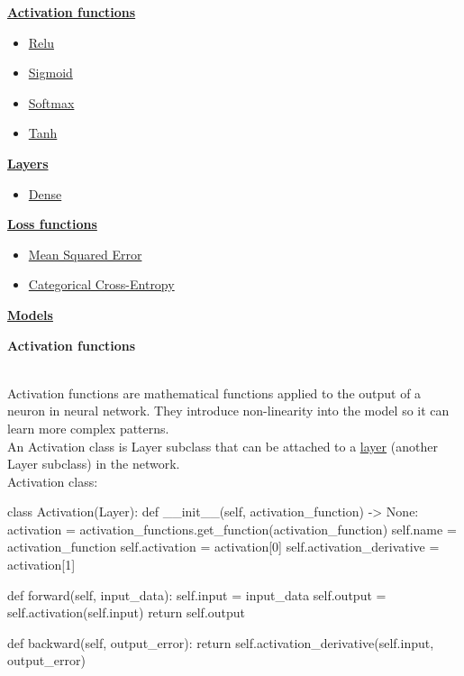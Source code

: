 \documentclass{article}
\begin{document}
    \hyperlink{activation_functions}{\textbf{Activation functions}}
    \begin{itemize}
        \item \hyperlink{relu}{Relu}
        \item \hyperlink{sigmoid}{Sigmoid}
        \item \hyperlink{softmax}{Softmax}
        \item \hyperlink{tanh}{Tanh}
    \end{itemize}

    \hyperlink{layers}{\textbf{Layers}}
    \begin{itemize}
        \item \hyperlink{dense_layer}{Dense}
    \end{itemize}
    \hyperlink{losses}{\textbf{Loss functions}}
    \begin{itemize}
        \item \hyperlink{mse}{Mean Squared Error}
        \item \hyperlink{cce}{Categorical Cross-Entropy}
    \end{itemize}
    \hyperlink{models}{\textbf{Models}} \\
    \clearpage

    \hypertarget{activation_functions}{\textbf{Activation functions}} \\

    Activation functions are mathematical functions applied to
    the output of a neuron in neural network. They introduce non-linearity into 
    the model so it can learn more complex patterns. \\

    An Activation class is Layer subclass that can be attached to a \hyperlink{layers}{\underline{layer}} 
    (another Layer subclass) in the network. \\

    Activation class:
    \begin{python}
class Activation(Layer):
    def __init__(self, activation_function) -> None:
        activation = activation_functions.get_function(activation_function)
        self.name = activation_function
        self.activation = activation[0]
        self.activation_derivative = activation[1]

    def forward(self, input_data):
        self.input = input_data
        self.output = self.activation(self.input)
        return self.output

    def backward(self, output_error):
        return self.activation_derivative(self.input, output_error)
    \end{python}
    \pagebreak
\end{document}
